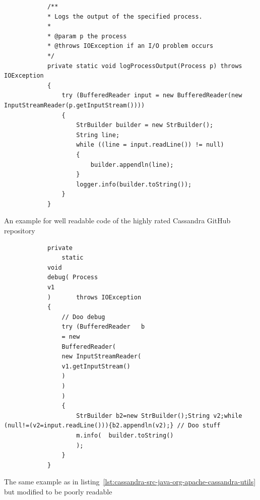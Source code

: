 \documentclass[%
class=scrreprt,
chapterprefix=false,%
open=right,%
twoside=false,%
paper=a4,%
logofile={Logo\_zentral\_farbig\_EN.png},%
thesistype=master,%
UKenglish,%
]{se2thesis}
\theoremstyle{definition}
\begin{document}
	
	\begin{listing}[!ht]
		\begin{verbatim}
			/**
			* Logs the output of the specified process.
			*
			* @param p the process
			* @throws IOException if an I/O problem occurs
			*/
			private static void logProcessOutput(Process p) throws IOException
			{
				try (BufferedReader input = new BufferedReader(new InputStreamReader(p.getInputStream())))
				{
					StrBuilder builder = new StrBuilder();
					String line;
					while ((line = input.readLine()) != null)
					{
						builder.appendln(line);
					}
					logger.info(builder.toString());
				}
			}
		\end{verbatim}
		\caption[An example for well readable code of the highly rated Cassandra GitHub repository]{An example for well readable code of the highly rated Cassandra GitHub repository}
		\label{lst:cassandra-src-java-org-apache-cassandra-utils}
	\end{listing}
	
	\begin{listing}[!ht]
		\begin{verbatim}
			private 
				static 
			void 
			debug( Process 
			v1 
			)       throws IOException
			{
				// Doo debug
				try (BufferedReader   b 
				= new 
				BufferedReader(
				new InputStreamReader(
				v1.getInputStream()
				)
				)
				)
				{
					StrBuilder b2=new StrBuilder();String v2;while (null!=(v2=input.readLine())){b2.appendln(v2);} // Doo stuff
					m.info(  builder.toString()
					);
				}
			}
		\end{verbatim}
		\caption{The same example as in listing~\ref{lst:cassandra-src-java-org-apache-cassandra-utils} but modified to be poorly readable}
		\label{lst:cassandra-src-java-org-apache-cassandra-utils-modified}
	\end{listing}
	
\end{document}
